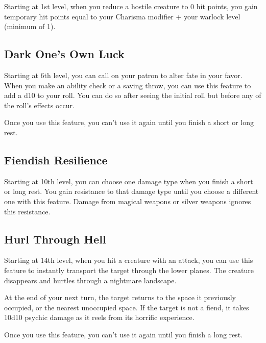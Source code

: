 Starting at 1st level, when you reduce a hostile creature to 0 hit points, you gain temporary hit points equal to your Charisma modifier + your warlock level (minimum of 1).

\subsection{Dark One's Own Luck}

Starting at 6th level, you can call on your patron to alter fate in your favor. When you make an ability check or a saving throw, you can use this feature to add a d10 to your roll. You can do so after seeing the initial roll but before any of the roll's effects occur.

Once you use this feature, you can't use it again until you finish a short or long rest.

\subsection{Fiendish Resilience}

Starting at 10th level, you can choose one damage type when you finish a short or long rest. You gain resistance to that damage type until you choose a different one with this feature. Damage from magical weapons or silver weapons ignores this resistance.

\subsection{Hurl Through Hell}

Starting at 14th level, when you hit a creature with an attack, you can use this feature to instantly transport the target through the lower planes. The creature disappears and hurtles through a nightmare landscape.

At the end of your next turn, the target returns to the space it previously occupied, or the nearest unoccupied space. If the target is not a fiend, it takes 10d10 psychic damage as it reels from its horrific experience.

Once you use this feature, you can't use it again until you finish a long rest.

